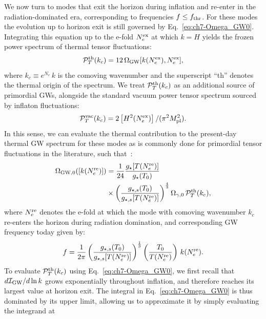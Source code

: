 We now turn to modes that exit the horizon during inflation and re-enter in the radiation-dominated era, corresponding to frequencies $f\leq f_{\rm thr}$. For these modes the evolution up to horizon exit is still governed by Eq.~\eqref{eq:ch7-Omega_GW0}. Integrating this equation up to the e-fold $N_e^{\rm ex}$ at which $k=H$ yields the frozen power spectrum of thermal tensor fluctuations:
\begin{equation}
\mathcal{P}^{\rm th}_T(k_c)=12\,\Omega_{\rm GW}[k(N_e^{\rm ex}),N_e^{\rm ex}], \label{eq:ch7-Pth}
\end{equation}
where $k_c\equiv e^{N_e}\,k$ is the comoving wavenumber and the superscript ``th'' denotes the thermal origin of the spectrum. We treat $\mathcal{P}^{\rm th}_T(k_c)$ as an additional source of primordial GWs, alongside the standard vacuum power tensor spectrum sourced by inflaton fluctuations:
\begin{equation}
\mathcal{P}^{\rm vac}_T(k_c)=2\left[H^2(N_e^{\rm ex})\right]/(\pi^2 M_{\rm pl}^2). \label{eq:ch7-standardPower}
\end{equation}
 In this sense, we can evaluate the thermal contribution to the present-day thermal GW spectrum for these modes  as is commonly done for primordial tensor fluctuations in the literature, such that~\cite{Kolb:1990vq}:
\begin{align}
\nonumber    \Omega_{\rm GW,0}([k(N^{\rm re}_{e})])&=\frac{1}{24}\frac{g_{\star}[T(N^{\rm re}_{e})]}{g_\star(T_0)}\\
 &\times\left(\frac{g_{\star,s}(T_0)}{g_{\star,s}[T(N^{\rm re}_{e})]}\right)^{\frac{4}{3}} \Omega_{\gamma,0}\,\mathcal{P}^{\rm th}_T(k_c), \label{eq:ch7-Omega_GW0_v3}
\end{align}
where $N_e^{\rm re}$ denotes the e-fold at which the mode with comoving wavenumber $k_c$ re-enters the horizon during radiation domination, and corresponding GW frequency today given by:
\begin{equation}
    f=\frac{1}{2\pi}\left(\frac{g_{\star,s}(T_0)}{g_{\star,s}[T(N^{\rm re}_{e})]}\right)^{\frac{1}{3}}\left(\frac{T_0}{T(N^{\rm re}_{e})}\right)\,k(N_e^{\rm re}). \label{eq:ch7-f_of_k_v2}
\end{equation}
To evaluate $\mathcal{P}_T^{\rm th}(k_c)$ using Eq.~\eqref{eq:ch7-Omega_GW0}, we first recall that $d\mathcal{I}_{\rm GW}/d\ln k$ grows exponentially throughout inflation, and therefore reaches its largest value at horizon exit. The integral in Eq.~\eqref{eq:ch7-Omega_GW0} is thus dominated by its upper limit, allowing us to approximate it by simply evaluating the integrand at
